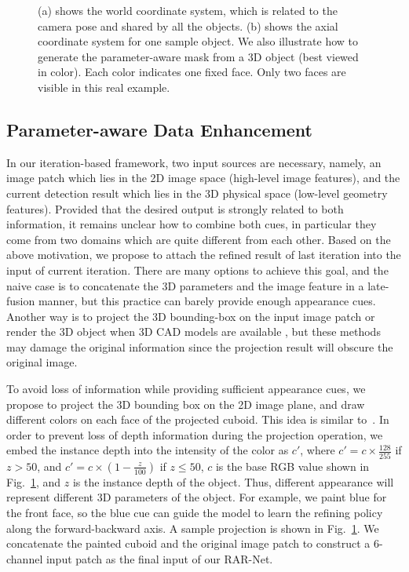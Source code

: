 \documentclass[runningheads]{llncs}
\begin{document}
\begin{figure}[t]
\centering
{}
\caption{(a) shows the world coordinate system, which is related to the camera pose and shared by all the objects. (b) shows the axial coordinate system for one sample object. We also illustrate how to generate the parameter-aware mask from a 3D object (best viewed in color). Each color indicates one fixed face. Only two faces are visible in this real example.}
\label{fig:sample}
\end{figure}

\subsection{Parameter-aware Data Enhancement}

In our iteration-based framework, two input sources are necessary, namely, an image patch which lies in the 2D image space (high-level image features), and the current detection result which lies in the 3D physical space (low-level geometry features). Provided that the desired output is strongly related to both information, it remains unclear how to combine both cues, in particular they come from two domains which are quite different from each other. 
Based on the above motivation, we propose to attach the refined result of last iteration into the input of current iteration. There are many options to achieve this goal, and the naive case is to concatenate the 3D parameters and the image feature in a late-fusion manner, but this practice can barely provide enough appearance cues. Another way is to project the 3D bounding-box on the input image patch \cite{liu2019deep} or render the 3D object when 3D CAD models are available \cite{kundu20183d}, but these methods may damage the original information since the projection result will obscure the original image. 

To avoid loss of information while providing sufficient appearance cues, we propose to project the 3D bounding box on the 2D image plane, and draw different colors on each face of the projected cuboid. This idea is similar to~\cite{ren2018deep}. In order to prevent loss of depth information during the projection operation, we embed the instance depth into the intensity of the color as $c'$, where $c'=c \times \frac{128}{255}$ if $z > 50$, and $c'=c \times (1-\frac{z}{100})$ if $z \le 50$, $c$ is the base RGB value shown in Fig.~\ref{fig:sample}, and $z$ is the instance depth of the object. Thus, different appearance will represent different 3D parameters of the object. For example, we paint blue for the front face, so the blue cue can guide the model to learn the refining policy along the forward-backward axis. A sample projection is shown in Fig.~\ref{fig:sample}. We concatenate the painted cuboid and the original image patch to construct a 6-channel input patch as the final input of our RAR-Net.
\end{document}

